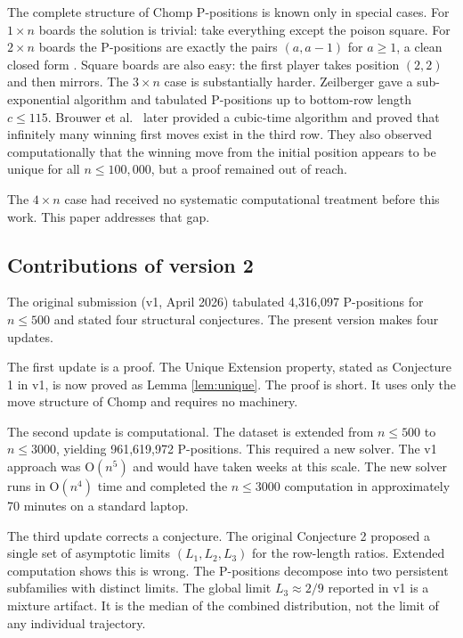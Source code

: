 \documentclass[12pt]{article}
\begin{document}
The complete structure of Chomp P-positions is known only in special
cases. For $1 \times n$ boards the solution is trivial: take everything
except the poison square. For $2 \times n$ boards the P-positions are
exactly the pairs $(a, a-1)$ for $a \geq 1$, a clean closed form
\cite{berlekamp2001}. Square boards are also easy: the first player
takes position $(2,2)$ and then mirrors. The $3 \times n$ case is
substantially harder. Zeilberger \cite{zeilberger2001} gave a
sub-exponential algorithm and tabulated P-positions up to bottom-row
length $c \leq 115$. Brouwer et al.\ \cite{brouwer2005} later provided
a cubic-time algorithm and proved that infinitely many winning first
moves exist in the third row. They also observed computationally that
the winning move from the initial position appears to be unique for all
$n \leq 100{,}000$, but a proof remained out of reach.

The $4 \times n$ case had received no systematic computational treatment
before this work. This paper addresses that gap.

\subsection*{Contributions of version 2}

The original submission (v1, April 2026) tabulated 4,316,097 P-positions
for $n \leq 500$ and stated four structural conjectures. The present
version makes four updates.

The first update is a proof. The Unique Extension property, stated as
Conjecture 1 in v1, is now proved as Lemma \ref{lem:unique}. The proof
is short. It uses only the move structure of Chomp and requires no
machinery.

The second update is computational. The dataset is extended from
$n \leq 500$ to $n \leq 3000$, yielding 961,619,972 P-positions. This
required a new solver. The v1 approach was O$(n^5)$ and would have taken
weeks at this scale. The new solver runs in O$(n^4)$ time and completed
the $n \leq 3000$ computation in approximately 70 minutes on a standard
laptop.

The third update corrects a conjecture. The original Conjecture 2
proposed a single set of asymptotic limits $(L_1, L_2, L_3)$ for the
row-length ratios. Extended computation shows this is wrong. The
P-positions decompose into two persistent subfamilies with distinct
limits. The global limit $L_3 \approx 2/9$ reported in v1 is a mixture
artifact. It is the median of the combined distribution, not the limit
of any individual trajectory.
\end{document}
